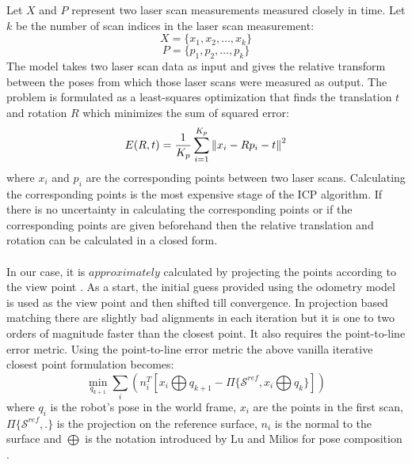Let $X$ and $P$ represent two laser scan measurements measured closely in time. Let $k$ be the number of scan indices in the laser scan measurement:
\begin{equation}
X = \{ x_1, x_2, \ldots, x_k \}	
\end{equation}
\begin{equation}
P = \{ p_1, p_2, \ldots, p_k \}	
\end{equation}
The model takes two laser scan data as input and gives the relative transform between the poses from which those laser scans were measured as output. The problem is formulated as a least-squares optimization that finds the translation $t$ and rotation $R$ which minimizes the sum of squared error:
\begin{equation}
E(R,t) = \frac{1}{K_p} \sum_{i=1}^{K_p} \left\lVert x_i - Rp_i - t\right\rVert^2
\end{equation}
where $x_i$ and $p_i$ are the corresponding points between two laser scans. Calculating the corresponding points is the most expensive stage of the ICP algorithm. If there is no uncertainty in calculating the corresponding points or if the corresponding points are given beforehand then the relative translation and rotation can be calculated in a closed form.
\paragraph{}
In our case, it is $approximately$ calculated by projecting the points according to the view point \cite{csmpaper}. As a start, the initial guess provided using the odometry model is used as the view point and then shifted till convergence. In projection based matching there are slightly bad alignments in each iteration but it is one to two orders of magnitude faster than the closest point. It also requires the point-to-line error metric. Using the point-to-line error metric the above vanilla iterative closest point formulation becomes:
\begin{equation}
\min_{q_{k+1}} \sum_i (n_i^T[x_i \bigoplus q_{k+1} - \Pi \{ \mathcal{S}^{ref}, x_i\bigoplus q_k \}])
\end{equation}
where $q_i$ is the robot's pose in the world frame, $x_i$ are the points in the first scan, $\Pi \{ \mathcal{S}^{ref}, .\}$ is the projection on the reference surface, $n_i$ is the normal to the surface and $\bigoplus$ is the notation introduced by Lu and Milios for pose composition \cite{lumiliosfirstgraphslam}.


